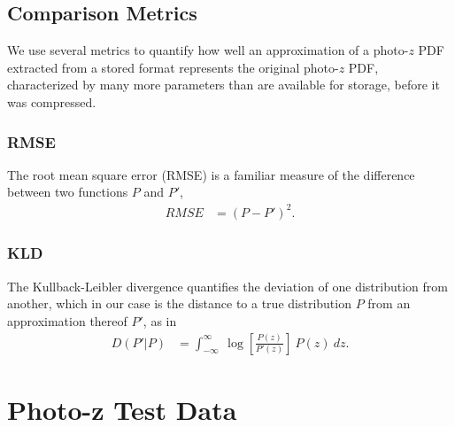 \documentclass[\docopts]{\docclass}
\newcommand{\pz}{photo-$z$ PDF}
\begin{document}
\subsection{Comparison Metrics}
\label{sec:metrics}


We use several metrics to quantify how well an approximation of a \pz  
extracted from a stored format represents the original \pz , characterized by 
many more parameters than are available for storage, before it was compressed.



\subsubsection{RMSE}
\label{sec:rms}

The root mean square error (RMSE) is a familiar measure of the difference 
between two functions $P$ and $P'$,
\begin{align}
  \label{eq:rmse}
  RMSE &= (P - P')^{2}.
\end{align}

\subsubsection{KLD}
\label{sec:kld}

The Kullback-Leibler divergence quantifies the deviation of one distribution 
from another, which in our case is the distance to a true distribution $P$ from 
an approximation thereof $P'$, as in
\begin{align}
  \label{eq:kld}
  D(P' | P) &= \int_{-\infty}^{\infty}\ \log\left[\frac{P(z)}{P'(z)}\right]\ 
P(z)\ dz.
\end{align}




\section{Photo-z Test Data}
\label{sec:data}
\end{document}

